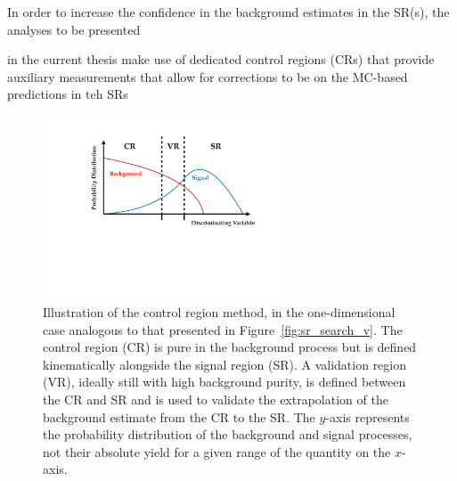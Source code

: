 In order to increase the confidence in the background estimates in the SR(s), the analyses to be presented


in the current thesis make use of dedicated control regions (CRs) that provide auxiliary measurements
that allow for corrections to be  on the MC-based predictions in teh SRs

\begin{figure}[!htb]
    \begin{center}
        \includegraphics[width=0.65\textwidth]{figures/common_ana/sr_search_v_CRPDF}
        \caption{
            Illustration of the control region method, in the one-dimensional case analogous to that
            presented in Figure~\ref{fig:sr_search_v}.
            The control region (CR) is pure in the background process but is defined kinematically alongside the signal region (SR).
            A validation region (VR), ideally still with high background purity, is defined between the CR and SR and is used to validate
            the extrapolation of the background estimate from the CR to the SR.
            The $y$-axis represents the probability distribution of the background and signal
            processes, not their absolute yield for a given range of the quantity on the $x$-axis.
        }
        \label{fig:sr_search_v_CR}
    \end{center}
\end{figure}

